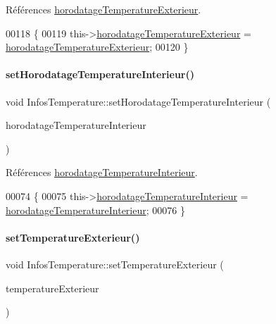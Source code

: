 Références \hyperlink{class_infos_temperature_a5c3cd364746dc1cae5f9faee55c7555e}{horodatage\+Temperature\+Exterieur}.


\begin{DoxyCode}
00118 \{
00119     this->\hyperlink{class_infos_temperature_a5c3cd364746dc1cae5f9faee55c7555e}{horodatageTemperatureExterieur} = 
      \hyperlink{class_infos_temperature_a5c3cd364746dc1cae5f9faee55c7555e}{horodatageTemperatureExterieur};
00120 \}
\end{DoxyCode}
\mbox{\label{class_infos_temperature_a4d846391dfd204515e68c3f005b7be3c}} 
\paragraph{\texorpdfstring{set\+Horodatage\+Temperature\+Interieur()}{setHorodatageTemperatureInterieur()}}
{\footnotesize\ttfamily void Infos\+Temperature\+::set\+Horodatage\+Temperature\+Interieur (\begin{DoxyParamCaption}\item[{const Q\+String}]{horodatage\+Temperature\+Interieur }\end{DoxyParamCaption})}



Références \hyperlink{class_infos_temperature_ad4c62d479b8897102a59025a56d7b4c6}{horodatage\+Temperature\+Interieur}.


\begin{DoxyCode}
00074 \{
00075     this->\hyperlink{class_infos_temperature_ad4c62d479b8897102a59025a56d7b4c6}{horodatageTemperatureInterieur} = 
      \hyperlink{class_infos_temperature_ad4c62d479b8897102a59025a56d7b4c6}{horodatageTemperatureInterieur};
00076 \}
\end{DoxyCode}
\mbox{\label{class_infos_temperature_a40f22fbc27ed768e8269cdbf3df708c6}} 
\paragraph{\texorpdfstring{set\+Temperature\+Exterieur()}{setTemperatureExterieur()}}
{\footnotesize\ttfamily void Infos\+Temperature\+::set\+Temperature\+Exterieur (\begin{DoxyParamCaption}\item[{double}]{temperature\+Exterieur }\end{DoxyParamCaption})}


